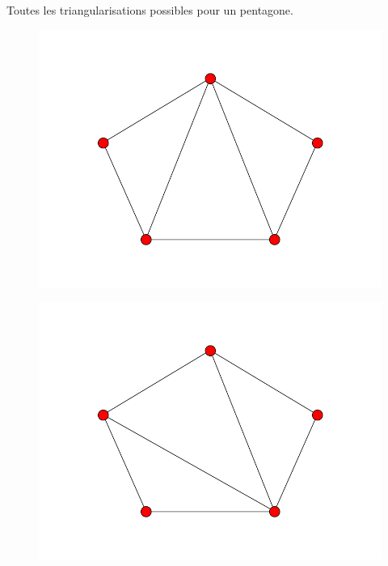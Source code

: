 \documentclass[fontsize=10pt]{article}
\begin{document}
\newpage
Toutes les triangularisations possibles pour un pentagone.

\begin{figure}[hbtp]
\centering
\includegraphics[scale=0.5]{imgs/pentagon/pentagon_1.png}
\end{figure}

\begin{figure}[hbtp]
\centering
\includegraphics[scale=0.5]{imgs/pentagon/pentagon_2.png}
\end{figure}
\end{document}
